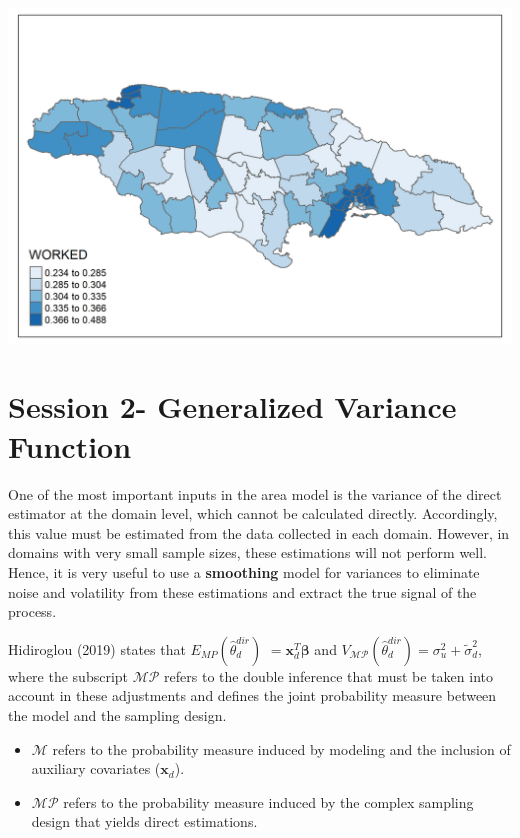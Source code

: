 \documentclass[
  12pt,
]{book}
\begin{document}
\includegraphics[width=4\linewidth]{Recursos/01_Session1/18_plot_Censo/WORKED}

\hypertarget{session-2--generalized-variance-function}{%
\chapter{Session 2- Generalized Variance Function}\label{session-2--generalized-variance-function}}

\justify

One of the most important inputs in the area model is the variance of the direct estimator at the domain level, which cannot be calculated directly. Accordingly, this value must be estimated from the data collected in each domain. However, in domains with very small sample sizes, these estimations will not perform well. Hence, it is very useful to use a \textbf{smoothing} model for variances to eliminate noise and volatility from these estimations and extract the true signal of the process.

Hidiroglou (2019) states that \(E_{{MP}}\left(\hat{\theta}^{dir}_d\right)\)
\(=\boldsymbol{x}^{T}_{d}\boldsymbol{\beta}\) and \(V_{\mathscr{MP}}\left(\hat{\theta}^{dir}_d\right)=\sigma_{u}^2+\tilde{\sigma}^2_{d}\), where the subscript \(\mathscr{MP}\) refers to the double inference that must be taken into account in these adjustments and defines the joint probability measure between the model and the sampling design.

\begin{itemize}
\item
  \(\mathscr{M}\) refers to the probability measure induced by modeling and the inclusion of auxiliary covariates (\(\boldsymbol{x}_{d}\)).
\item
  \(\mathscr{MP}\) refers to the probability measure induced by the complex sampling design that yields direct estimations.
\end{itemize}
\end{document}
